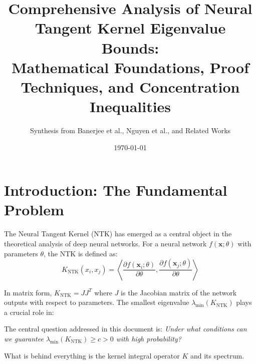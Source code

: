 \documentclass{article}
\title{Comprehensive Analysis of Neural Tangent Kernel Eigenvalue Bounds:\\
Mathematical Foundations, Proof Techniques, and Concentration Inequalities}
\author{Synthesis from Banerjee et al., Nguyen et al., and Related Works}
\date{\today}
\newcommand{\x}{\mathbf{x}}
\newcommand{\KNTK}{K_{\text{NTK}}}
\newcommand{\lambdaMin}{\lambda_{\min}}
\newcommand{\TildeOmega}{\tilde{\Omega}}
\begin{document}
\maketitle

\begin{abstract}
\end{abstract}

\tableofcontents
\newpage

\section{Introduction: The Fundamental Problem}

The Neural Tangent Kernel (NTK) has emerged as a central object in the theoretical analysis of deep neural networks. For a neural network $f(\x; \theta)$ with parameters $\theta$, the NTK is defined as:
$$\KNTK(x_i, x_j) = \left\langle \frac{\partial f(\x_i; \theta)}{\partial \theta}, \frac{\partial f(\x_j; \theta)}{\partial \theta} \right\rangle$$

In matrix form, $\KNTK = JJ^T$ where $J$ is the Jacobian matrix of the network outputs with respect to parameters. The smallest eigenvalue $\lambdaMin(\KNTK)$ plays a crucial role in:


The central question addressed in this document is: \textit{Under what conditions can we guarantee $\lambdaMin(\KNTK) \geq c > 0$ with high probability?}


What is behind everything is the kernel integral operator $K$ and its spectrum.
\end{document}
